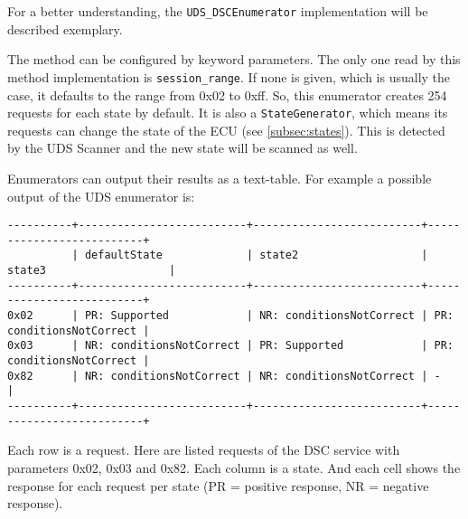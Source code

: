 For a better understanding, the \texttt{UDS_DSCEnumerator} implementation will be described exemplary.


The method can be configured by keyword parameters. 
The only one read by this method implementation is \texttt{session_range}. 
If none is given, which is usually the case, it defaults to the range from 0x02 to 0xff. 
So, this enumerator creates 254 requests for each state by default. 
It is also a \texttt{StateGenerator}, which means its requests can change the state of the ECU (see \autoref{subsec:states}). This is detected by the UDS Scanner and the new state will be scanned as well.

Enumerators can output their results as a text-table. For example a possible output of the UDS enumerator is:

\begin{samepage}
\begin{verbatim}
----------+--------------------------+--------------------------+--------------------------+
          | defaultState             | state2                   | state3                   | 
----------+--------------------------+--------------------------+--------------------------+
0x02      | PR: Supported            | NR: conditionsNotCorrect | PR: conditionsNotCorrect | 
0x03      | NR: conditionsNotCorrect | PR: Supported            | PR: conditionsNotCorrect | 
0x82      | NR: conditionsNotCorrect | NR: conditionsNotCorrect | -                        | 
----------+--------------------------+--------------------------+--------------------------+
\end{verbatim}
\end{samepage}

Each row is a request. Here are listed requests of the DSC service with parameters 0x02, 0x03 and 0x82. 
Each column is a state. And each cell shows the response for each request per state (PR = positive response, NR = negative response).

